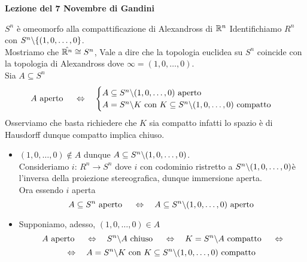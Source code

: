 

\textbf{Lezione del 7 Novembre di Gandini}
\begin{thm}$S^n $ \`e omeomorfo alla compattificazione di Alexandross di $\mathbb{R}^n$
\proof Identifichiamo $R^n$ con $S^n \backslash \{ (1,0, \dots,  0\}$.\\
Mostriamo che $\hat{\mathbb{R}^n} \cong S^n$, Vale a dire che la topologia euclidea su $S^n$ coincide con la topologia di Alexandross  dove  $\infty=(1,0, \dots, 0)$.\\
Sia $A\subseteq S^n$ 
$$ A \text{ aperto } \quad\Leftrightarrow \quad \begin{cases} A \subseteq S^n \backslash (1, 0,\dots , 0 )  \text{ aperto }\\
A = S^n \backslash K \text{ con } K \subseteq S^n \backslash (1, 0, \dots, 0) \text{ compatto} \end{cases}$$
Osserviamo che basta richiedere che $K$ sia compatto infatti lo spazio \`e di Hausdorff dunque compatto implica chiuso.
\begin{itemize}
\item $(1, 0, \dots,0) \not \in A $ dunque  $A \subseteq S^n \backslash (1, 0,\dots , 0 ) $.\\
Consideriamo $i:\, R^n \to S^n$ dove $i$ con codominio ristretto  a $S^n\backslash (1, 0, \dots, 0) $\`e l'inversa della proiezione stereografica, dunque immersione aperta.\\
Ora essendo $i$ aperta 
$$ A \subseteq S^n \text{ aperto } \quad \Leftrightarrow \quad A\subseteq S^n \backslash (1,0, \dots , 0) \text{ aperto }$$
\item Supponiamo, adesso, $(1, 0, \dots, 0)\in A$ 
$$ A \text{ aperto } \quad \Leftrightarrow \quad S^n \backslash A \text{ chiuso } \quad \Leftrightarrow \quad K = S^n \backslash A \text{ compatto } \quad \Leftrightarrow $$ $$ \Leftrightarrow \quad A = S^n \backslash K \text{ con } K \subseteq S^n \backslash (1,0, \dots, 0) \text{ compatto } $$
\end{itemize}
\endproof
\end{thm}
\spazio

